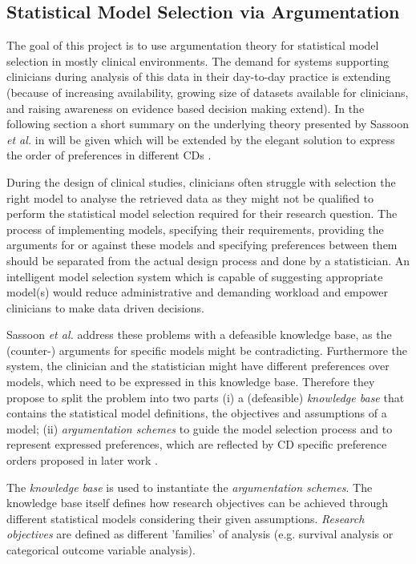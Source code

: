 \subsection{Statistical Model Selection via Argumentation}

\label{sub:statistical_model_selection}

The goal of this project is to use argumentation theory for statistical model selection in mostly clinical environments. The demand for systems supporting clinicians during analysis of this data in their day-to-day practice is extending (because of increasing availability, growing size of datasets available for clinicians, and raising awareness on evidence based decision making extend). In the following section a short summary on the underlying theory presented by Sassoon \textit{et al.} in \cite{sassoon2014} will be given which will be extended by the elegant solution to express the order of preferences in different \glspl{CD} \cite{sassoon2016,sassoon2016CD}.

During the design of clinical studies, clinicians often struggle with selection the right model to analyse the retrieved data as they might not be qualified to perform the statistical model selection required for their research question. The process of implementing models, specifying their requirements, providing the arguments for or against these models and specifying preferences between them should be separated from the actual design process and  done by a statistician. An intelligent model selection system which is capable of suggesting appropriate model(s) would reduce administrative and demanding workload and empower clinicians to make data driven decisions.

Sassoon \textit{et al.} \cite{sassoon2014} address these problems with a defeasible knowledge base, as the (counter-) arguments for specific models might be contradicting. Furthermore the system, the clinician and the statistician might have different preferences over models, which need to be expressed in this  knowledge base. Therefore they propose to split the problem into two parts (i) a (defeasible) \textit{knowledge base} that contains the statistical model definitions, the objectives and assumptions of a model; (ii) \textit{argumentation schemes} to guide the model selection process and to represent expressed preferences, which are reflected by \gls{CD} specific preference orders proposed in later work \cite{sassoon2016,sassoon2016CD} .

The \textit{knowledge base} is used to instantiate the \textit{argumentation schemes}. The knowledge base itself defines how research objectives can be achieved through different statistical models considering their given assumptions. \textit{Research objectives} are defined as different 'families' of analysis (e.g. survival analysis or categorical outcome variable analysis).


